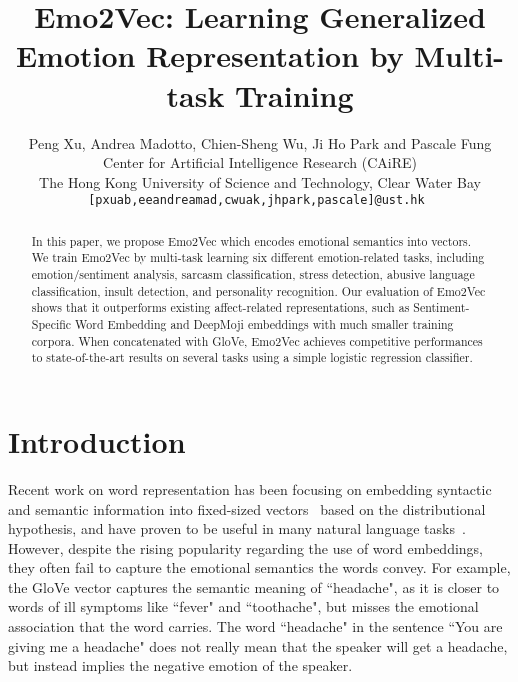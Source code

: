 \documentclass[11pt,a4paper]{article}
\title{Emo2Vec: Learning Generalized Emotion Representation by Multi-task Training}
\author{Peng Xu, Andrea Madotto, Chien-Sheng Wu, Ji Ho Park {\normalfont and} Pascale Fung  \\
  Center for Artificial Intelligence Research (CAiRE) \\
  The Hong Kong University of Science and Technology, Clear Water Bay \\
  {\tt [pxuab,eeandreamad,cwuak,jhpark,pascale]@ust.hk }
  \\}
\date{}
\begin{document}
\maketitle
\begin{abstract}


In this paper, we propose Emo2Vec which encodes emotional semantics into vectors. We train Emo2Vec by multi-task learning six different emotion-related tasks, including emotion/sentiment analysis, sarcasm classification, stress detection, abusive language classification, insult detection, and personality recognition. Our evaluation of Emo2Vec shows that it outperforms existing affect-related representations, such as Sentiment-Specific Word Embedding and DeepMoji embeddings with much smaller training corpora. When concatenated with GloVe, Emo2Vec achieves competitive performances to state-of-the-art results on several tasks using a simple logistic regression classifier. 

 










\end{abstract}

\section{Introduction}







Recent work on word representation has been focusing on embedding syntactic and semantic information into fixed-sized vectors~\cite{Mikolov2013,Pennington2014} based on the distributional hypothesis,  and have proven to be useful in many natural language tasks~\cite{Collobert2011}. However, despite the rising popularity regarding the use of word embeddings, they often fail to capture the emotional semantics the words convey. For example, the GloVe vector captures the semantic meaning of ``headache", as it is closer to words of ill symptoms like ``fever" and ``toothache", but misses the emotional association that the word carries. The word ``headache" in the sentence ``You are giving me a headache" does not really mean that the speaker will get a headache, but instead implies the negative emotion of the speaker.  
 
\end{document}
